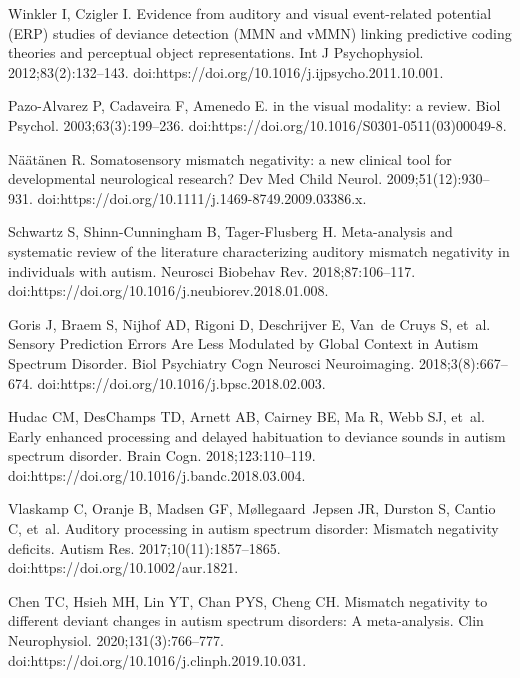 \documentclass[10pt,letterpaper]{article}
\begin{document}
\begin{thebibliography}{100}
  Winkler I, Czigler I.
  \newblock Evidence from auditory and visual event-related potential ({ERP})
    studies of deviance detection ({MMN} and {vMMN}) linking predictive coding
    theories and perceptual object representations.
  \newblock Int J Psychophysiol. 2012;83(2):132--143.
  \newblock doi:{https://doi.org/10.1016/j.ijpsycho.2011.10.001}.
  
  Pazo-Alvarez P, Cadaveira F, Amenedo E.
   in the visual modality: a review.
  \newblock Biol Psychol. 2003;63(3):199--236.
  \newblock doi:{https://doi.org/10.1016/S0301-0511(03)00049-8}.
  
  N{\"a}{\"a}t{\"a}nen R.
  \newblock Somatosensory mismatch negativity: a new clinical tool for
    developmental neurological research?
  \newblock Dev Med Child Neurol. 2009;51(12):930--931.
  \newblock doi:{https://doi.org/10.1111/j.1469-8749.2009.03386.x}.
  
  Schwartz S, Shinn-Cunningham B, Tager-Flusberg H.
  \newblock Meta-analysis and systematic review of the literature characterizing
    auditory mismatch negativity in individuals with autism.
  \newblock Neurosci Biobehav Rev. 2018;87:106--117.
  \newblock doi:{https://doi.org/10.1016/j.neubiorev.2018.01.008}.
  
  Goris J, Braem S, Nijhof AD, Rigoni D, Deschrijver E, Van~de Cruys S, et~al.
  \newblock Sensory Prediction Errors Are Less Modulated by Global Context in
    Autism Spectrum Disorder.
  \newblock Biol Psychiatry Cogn Neurosci Neuroimaging. 2018;3(8):667--674.
  \newblock doi:{https://doi.org/10.1016/j.bpsc.2018.02.003}.
  
  Hudac CM, DesChamps TD, Arnett AB, Cairney BE, Ma R, Webb SJ, et~al.
  \newblock Early enhanced processing and delayed habituation to deviance sounds
    in autism spectrum disorder.
  \newblock Brain Cogn. 2018;123:110--119.
  \newblock doi:{https://doi.org/10.1016/j.bandc.2018.03.004}.
  
  Vlaskamp C, Oranje B, Madsen GF, M{\o}llegaard~Jepsen JR, Durston S, Cantio C,
    et~al.
  \newblock Auditory processing in autism spectrum disorder: Mismatch negativity
    deficits.
  \newblock Autism Res. 2017;10(11):1857--1865.
  \newblock doi:{https://doi.org/10.1002/aur.1821}.
  
  Chen TC, Hsieh MH, Lin YT, Chan PYS, Cheng CH.
  \newblock Mismatch negativity to different deviant changes in autism spectrum
    disorders: A meta-analysis.
  \newblock Clin Neurophysiol. 2020;131(3):766--777.
  \newblock doi:{https://doi.org/10.1016/j.clinph.2019.10.031}.
  

\end{thebibliography}
\end{document}
